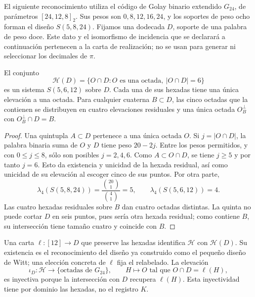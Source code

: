 El siguiente reconocimiento utiliza el código de Golay binario
extendido $G_{24}$, de parámetros $[24,12,8]_2$. Sus pesos son
$0,8,12,16,24$, y los soportes de peso ocho forman el diseño
$S(5,8,24)$. Fijamos una dodecada $D$, soporte de una palabra de peso
doce. Este dato y el isomorfismo de incidencia que se declarará a
continuación pertenecen a la carta de realización; no se usan para
generar ni seleccionar los decimales de $\pi$.

\begin{proposition}
\label{x_reciprocidad:exc:residuo-binario}
El conjunto
\[
 \mathcal H(D)=
 \{O\cap D: O\text{ es una octada},\ |O\cap D|=6\}
\]
es un sistema $S(5,6,12)$ sobre $D$. Cada una de sus hexadas tiene
una única elevación a una octada. Para cualquier cuaterna $B\subset D$,
las cinco octadas que la contienen se distribuyen en cuatro elevaciones
residuales y una única octada $O_B^\perp$ con $O_B^\perp\cap D=B$.
\end{proposition}

\begin{proof}
Una quintupla $A\subset D$ pertenece a una única octada $O$. Si
$j=|O\cap D|$, la palabra binaria suma de $O$ y $D$ tiene peso
$20-2j$. Entre los pesos permitidos, y con $0\leq j\leq8$, sólo
son posibles $j=2,4,6$. Como $A\subset O\cap D$, se tiene $j\geq5$
y por tanto $j=6$. Esto da existencia y unicidad de la hexada
residual, así como unicidad de su elevación al escoger cinco de sus
puntos. Por otra parte,
\[
 \lambda_4(S(5,8,24))=\frac{\binom{20}1}{\binom41}=5,
 \qquad
 \lambda_4(S(5,6,12))=4.
\]
Las cuatro hexadas residuales sobre $B$ dan cuatro octadas distintas.
La quinta no puede cortar $D$ en seis puntos, pues sería otra hexada
residual; como contiene $B$, su intersección tiene tamaño cuatro y
coincide con $B$.
\end{proof}

Una carta $\ell:[12]\to D$ que preserve las hexadas identifica
$\mathcal H$ con $\mathcal H(D)$. Su existencia es el reconocimiento
del diseño ya construido como el pequeño diseño de Witt; una elección
concreta de $\ell$ fija el relabelado. La elevación
\[
 \iota_D:\mathcal H\longrightarrow
       \{\text{octadas de }G_{24}\},
 \qquad H\longmapsto O\text{ tal que }O\cap D=\ell(H),
\]
es inyectiva porque la intersección con $D$ recupera $\ell(H)$.
Esta inyectividad tiene por dominio las hexadas, no el registro $K$.

